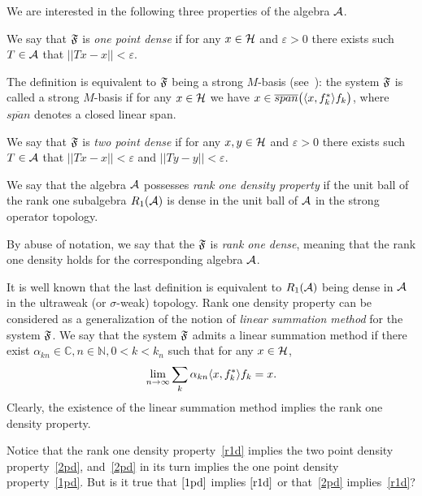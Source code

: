 \documentclass[12pt,oneside,a4paper]{amsart}
\begin{document}
  We are interested in the following three properties of the algebra $\cal{A}$.
  \begin{definition}
    \label{1pd}
    We say that $\fsys$ is \emph{one point dense} if for any $x \in \cal{H}$ and $\varepsilon > 0$
      there exists such $T\in \cal{A}$ that $||Tx - x|| < \varepsilon$.

  \end{definition}
    The definition is equivalent to $\fsys$ being a strong $M$-basis (see~\cite{katavolos}):
    the system $\fsys$ is called a strong $M$-basis if for any $x\in\cal{H}$ we have $x \in \overline{span}\big(\inner{x}{f^*_k}f_k\big)$, where
      $\overline{span}$ denotes a closed linear span.
  \begin{definition}
    \label{2pd}
    We say that $\fsys$ is \emph{two point dense} if for any $x, y \in \cal{H}$ and $\varepsilon > 0$
      there exists such $T\in \cal{A}$ that $||Tx - x|| < \varepsilon$ and $||Ty - y|| < \varepsilon$.
  \end{definition}
  \begin{definition}
    \label{r1d}
    We say that the algebra $\cal{A}$ possesses \emph{rank one density property} if
      the unit ball of the rank one subalgebra $R_1(\cal{A})$ is dense in the unit ball of $\cal{A}$ in the strong operator topology.
  \end{definition}
  By abuse of notation, we say that the $\fsys$ is \emph{rank one dense}, meaning that the rank one density holds for the corresponding algebra $\cal{A}$.

  It is well known that the last definition is equivalent to $R_1(\cal{A})$ being dense
    in $\cal{A}$ in the ultraweak (or $\sigma$-weak) topology.
  Rank one density property can be considered as a generalization of the notion of \emph{linear summation method} for the system $\fsys$.
  We say that the system $\fsys$ admits a linear summation method if there exist $\alpha_{kn} \in \mathbb{C}, n \in \mathbb{N}, 0 < k < k_n$
    such that for any $x \in \cal{H}$,
    \[
      \lim_{n \to \infty} \sum_k \alpha_{kn} \inner{x}{f^*_k}f_k = x.
    \]
  Clearly, the existence of the linear summation method implies the rank one density property.

  Notice that the rank one density property~\eqref{r1d} implies the two point density property~\eqref{2pd}, and~\eqref{2pd}
    in its turn implies the one point density property~\eqref{1pd}.
  But is it true that $\eqref{1pd}$ implies $\eqref{r1d}$ or that~\eqref{2pd} implies~\eqref{r1d}?
\end{document}
